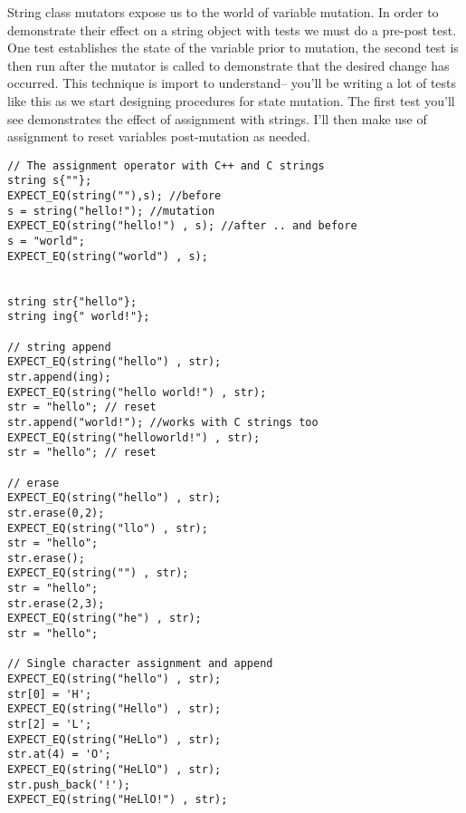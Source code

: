 \documentclass[]{tufte-handout}
\begin{document}
String class mutators expose us to the world of variable mutation. In order to demonstrate their effect on a string object with tests we must do a pre-post test. One test establishes the state of the variable prior to mutation, the second test is then run after the mutator is called to demonstrate that the desired change has occurred. This technique is import to understand-- you'll be writing a lot of tests like this as we start designing procedures for state mutation.  The first test you'll see demonstrates the effect of assignment\sidenote{$=$} with strings.  I'll then make use of assignment to reset variables post-mutation as needed.
\begin{verbatim}
// The assignment operator with C++ and C strings
string s{""};
EXPECT_EQ(string(""),s); //before
s = string("hello!"); //mutation
EXPECT_EQ(string("hello!") , s); //after .. and before
s = "world";
EXPECT_EQ(string("world") , s);


string str{"hello"};
string ing{" world!"};

// string append
EXPECT_EQ(string("hello") , str);
str.append(ing);
EXPECT_EQ(string("hello world!") , str);
str = "hello"; // reset
str.append("world!"); //works with C strings too
EXPECT_EQ(string("helloworld!") , str);
str = "hello"; // reset

// erase
EXPECT_EQ(string("hello") , str);
str.erase(0,2);
EXPECT_EQ(string("llo") , str);
str = "hello";
str.erase();
EXPECT_EQ(string("") , str);
str = "hello";
str.erase(2,3);
EXPECT_EQ(string("he") , str);
str = "hello";

// Single character assignment and append
EXPECT_EQ(string("hello") , str);
str[0] = 'H';
EXPECT_EQ(string("Hello") , str);
str[2] = 'L';
EXPECT_EQ(string("HeLlo") , str);
str.at(4) = 'O';
EXPECT_EQ(string("HeLlO") , str);
str.push_back('!');
EXPECT_EQ(string("HeLlO!") , str);
\end{verbatim}
\end{document}

